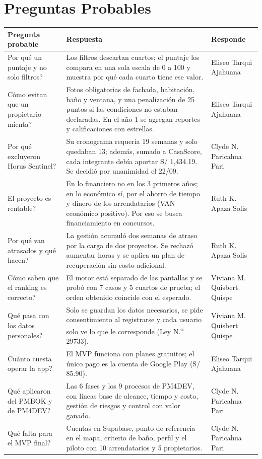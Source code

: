 \documentclass[11pt,a4paper]{article}
\begin{document}
\section{Preguntas Probables}
{\footnotesize
\setlength{\tabcolsep}{3.5pt}
\noindent\begin{tabularx}{\textwidth}{@{}P{4.0cm} L P{2.5cm}@{}}
\toprule
{}
\textbf{Pregunta probable} & \textbf{Respuesta} & \textbf{Responde} \\
\midrule
Por qué un puntaje y no solo filtros? & Los filtros descartan cuartos; el puntaje los compara en una sola escala de 0 a 100 y muestra por qué cada cuarto tiene ese valor. & Eliseo Tarqui Ajahuana \\
Cómo evitan que un propietario mienta? & Fotos obligatorias de fachada, habitación, baño y ventana, y una penalización de 25 puntos si las condiciones no estaban declaradas. En el año 1 se agregan reportes y calificaciones con estrellas. & Eliseo Tarqui Ajahuana \\
Por qué excluyeron Horus Sentinel? & Su cronograma requería 19 semanas y solo quedaban 13; además, sumado a CasaScore, cada integrante debía aportar S/ 1,434.19. Se decidió por unanimidad el 22/09. & Clyde N. Paricahua Pari \\
El proyecto es rentable? & En lo financiero no en los 3 primeros años; en lo económico sí, por el ahorro de tiempo y dinero de los arrendatarios (VAN económico positivo). Por eso se busca financiamiento en concursos. & Ruth K. Apaza Solis \\
Por qué van atrasados y qué hacen? & La gestión acumuló dos semanas de atraso por la carga de dos proyectos. Se rechazó aumentar horas y se aplica un plan de recuperación sin costo adicional. & Ruth K. Apaza Solis \\
Cómo saben que el ranking es correcto? & El motor está separado de las pantallas y se probó con 7 casos y 5 cuartos de prueba; el orden obtenido coincide con el esperado. & Viviana M. Quisbert Quispe \\
Qué pasa con los datos personales? & Solo se guardan los datos necesarios, se pide consentimiento al registrarse y cada usuario solo ve lo que le corresponde (Ley N.\textsuperscript{o} 29733). & Viviana M. Quisbert Quispe \\
Cuánto cuesta operar la app? & El MVP funciona con planes gratuitos; el único pago es la cuenta de Google Play (S/ 85.90). & Eliseo Tarqui Ajahuana \\
Qué aplicaron del PMBOK y de PM4DEV? & Las 6 fases y los 9 procesos de PM4DEV, con líneas base de alcance, tiempo y costo, gestión de riesgos y control con valor ganado. & Clyde N. Paricahua Pari \\
Qué falta para el MVP final? & Cuentas en Supabase, punto de referencia en el mapa, criterio de baño, perfil y el piloto con 10 arrendatarios y 5 propietarios. & Clyde N. Paricahua Pari \\
\bottomrule
\end{tabularx}
}
\end{document}

